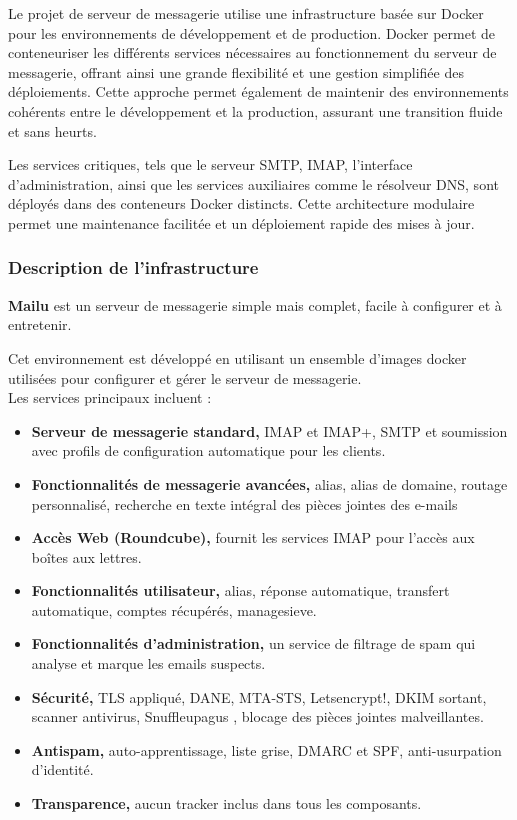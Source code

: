 Le projet de serveur de messagerie utilise une infrastructure basée sur Docker pour les environnements de développement et de production. Docker permet de conteneuriser les différents services nécessaires au fonctionnement du serveur de messagerie, offrant ainsi une grande flexibilité et une gestion simplifiée des déploiements.
Cette approche permet également de maintenir des environnements cohérents entre le développement et la production, assurant une transition fluide et sans heurts.

Les services critiques, tels que le serveur SMTP, IMAP, l'interface d'administration, ainsi que les services auxiliaires comme le résolveur DNS, sont déployés dans des conteneurs Docker distincts. Cette architecture modulaire permet une maintenance facilitée et un déploiement rapide des mises à jour.

\subsubsection{Description de l'infrastructure}

\textbf{Mailu} est un serveur de messagerie simple mais complet, facile à configurer et à entretenir.

Cet environnement est développé en utilisant un ensemble d'images docker utilisées pour configurer et gérer le serveur de messagerie.\\

\noindent Les services principaux incluent :
\begin{itemize}
	\item \textbf{Serveur de messagerie standard,} IMAP et IMAP+, SMTP et soumission avec profils de configuration automatique pour les clients.
	\item \textbf{Fonctionnalités de messagerie avancées,} alias, alias de domaine, routage personnalisé, recherche en texte intégral des pièces jointes des e-mails
	\item \textbf{Accès Web (Roundcube),} fournit les services IMAP pour l'accès aux boîtes aux lettres.
	\item \textbf{Fonctionnalités utilisateur,} alias, réponse automatique, transfert automatique, comptes récupérés, managesieve.
	\item \textbf{Fonctionnalités d'administration,} un service de filtrage de spam qui analyse et marque les emails suspects.
	\item \textbf{Sécurité,} TLS appliqué, DANE, MTA-STS, Letsencrypt!, DKIM sortant, scanner antivirus, Snuffleupagus , blocage des pièces jointes malveillantes.
	\item \textbf{Antispam,} auto-apprentissage, liste grise, DMARC et SPF, anti-usurpation d'identité.
	\item \textbf{Transparence,} aucun tracker inclus dans tous les composants.
\end{itemize}


